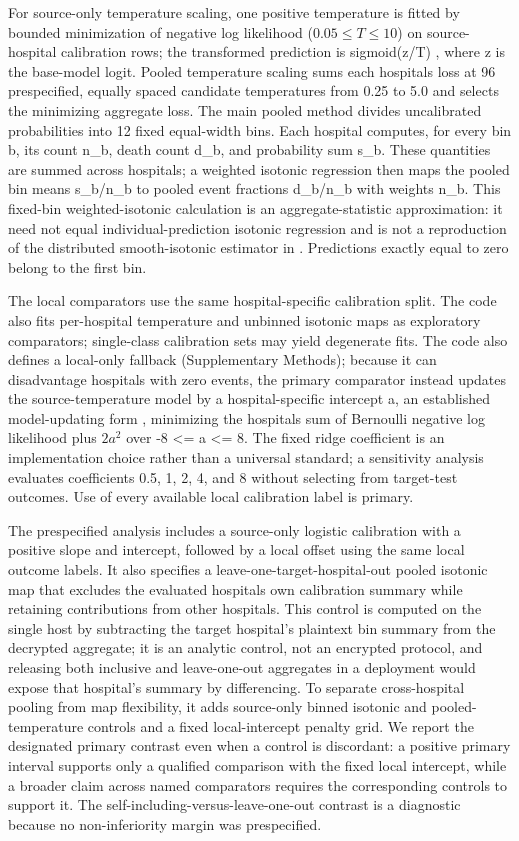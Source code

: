 \documentclass[11pt]{article}
\begin{document}
For source-only temperature scaling, one positive temperature is fitted by bounded minimization of negative log likelihood ($0.05\le T\le 10$) on source-hospital calibration rows; the transformed prediction is sigmoid(z/T) \cite{r15}, where z is the base-model logit. Pooled temperature scaling sums each hospital\textquotesingle s loss at 96 prespecified, equally spaced candidate temperatures from 0.25 to 5.0 and selects the minimizing aggregate loss. The main pooled method divides uncalibrated probabilities into 12 fixed equal-width bins. Each hospital computes, for every bin b, its count n\_b, death count d\_b, and probability sum s\_b. These quantities are summed across hospitals; a weighted isotonic regression then maps the pooled bin means s\_b/n\_b to pooled event fractions d\_b/n\_b with weights n\_b. This fixed-bin weighted-isotonic calculation is an aggregate-statistic approximation: it need not equal individual-prediction isotonic regression and is not a reproduction of the distributed smooth-isotonic estimator in \cite{r4}. Predictions exactly equal to zero belong to the first bin.

The local comparators use the same hospital-specific calibration split. The code also fits per-hospital temperature and unbinned isotonic maps as exploratory comparators; single-class calibration sets may yield degenerate fits. The code also defines a local-only fallback (Supplementary Methods); because it can disadvantage hospitals with zero events, the primary comparator instead updates the source-temperature model by a hospital-specific intercept a, an established model-updating form \cite{r17,janssen2008}, minimizing the hospital\textquotesingle s sum of Bernoulli negative log likelihood plus $2a^2$ over -8 \textless= a \textless= 8. The fixed ridge coefficient is an implementation choice rather than a universal standard; a sensitivity analysis evaluates coefficients 0.5, 1, 2, 4, and 8 without selecting from target-test outcomes. Use of every available local calibration label is primary.

The prespecified analysis includes a source-only logistic calibration with a positive slope and intercept, followed by a local offset using the same local outcome labels. It also specifies a leave-one-target-hospital-out pooled isotonic map that excludes the evaluated hospital\textquotesingle s own calibration summary while retaining contributions from other hospitals. This control is computed on the single host by subtracting the target hospital's plaintext bin summary from the decrypted aggregate; it is an analytic control, not an encrypted protocol, and releasing both inclusive and leave-one-out aggregates in a deployment would expose that hospital's summary by differencing. To separate cross-hospital pooling from map flexibility, it adds source-only binned isotonic and pooled-temperature controls and a fixed local-intercept penalty grid. We report the designated primary contrast even when a control is discordant: a positive primary interval supports only a qualified comparison with the fixed local intercept, while a broader claim across named comparators requires the corresponding controls to support it. The self-including-versus-leave-one-out contrast is a diagnostic because no non-inferiority margin was prespecified.
\end{document}
